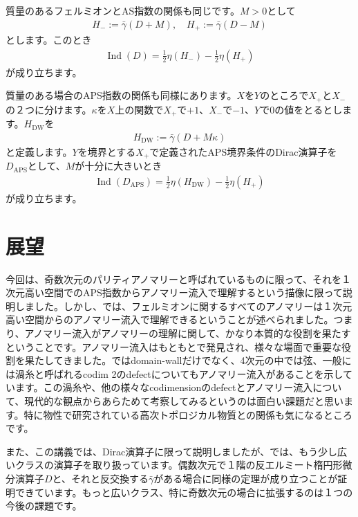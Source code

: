 \documentclass[paper=a4, fontsize=12pt, line_length=16cm, number_of_lines=33,dvipdfmx]{jlreq}
\numberwithin{equation}{section}
\newcommand{\gammab}{\bar{\gamma}}
\DeclareMathOperator{\Ind}{\mathrm{Ind}}
\newcommand{\DAPS}{D_{\mathrm{APS}}}
\newcommand{\Hm}{H_{-}}
\newcommand{\Hp}{H_{+}}
\newcommand{\HDW}{H_{\mathrm{DW}}}
\begin{document}
質量のあるフェルミオンとAS指数の関係も同じです。$M>0$として
\begin{align}
  \Hm:=\gammab(D+M),\quad \Hp:=\gammab(D-M)
\end{align}
とします。このとき
\begin{align}
  \Ind(D)=\frac12\eta(\Hm)-\frac12 \eta(\Hp)
\end{align}
が成り立ちます。

質量のある場合のAPS指数の関係も同様にあります。$X$を$Y$のところで$X_{+}$と$X_{-}$の２つに分けます。$\kappa$を$X$上の関数で$X_{+}$で$+1$、$X_{-}$で$-1$、$Y$で$0$の値をとるとします。$\HDW$を
\begin{align}
  \HDW:=\gammab(D+M\kappa)
\end{align}
と定義します。$Y$を境界とする$X_{+}$で定義されたAPS境界条件のDirac演算子を$\DAPS$として、$M$が十分に大きいとき
\begin{align}
  \Ind(\DAPS)=\frac12 \eta(\HDW)-\frac12 \eta(\Hp)\label{massiveAPSgeneraldim}
\end{align}
が成り立ちます。


\section{展望}

今回は、奇数次元のパリティアノマリーと呼ばれているものに限って、それを１次元高い空間でのAPS指数からアノマリー流入で理解するという描像に限って説明しました。しかし、\cite{Witten:2015aba}では、フェルミオンに関するすべてのアノマリーは１次元高い空間からのアノマリー流入で理解できるということが述べられました。つまり、アノマリー流入がアノマリーの理解に関して、かなり本質的な役割を果たすということです。アノマリー流入はもともと\cite{Callan:1984sa}で発見され、様々な場面で重要な役割を果たしてきました。\cite{Callan:1984sa}ではdomain-wallだけでなく、4次元の中では弦、一般には渦糸と呼ばれるcodim 2のdefectについてもアノマリー流入があることを示しています。この渦糸や、他の様々なcodimensionのdefectとアノマリー流入について、現代的な観点からあらためて考察してみるというのは面白い課題だと思います。特に物性で研究されている高次トポロジカル物質との関係も気になるところです。

また、この講義では、Dirac演算子に限って説明しましたが、\cite{Fukaya:2019qlf}では、もう少し広いクラスの演算子を取り扱っています。偶数次元で１階の反エルミート楕円形微分演算子$D$と、それと反交換する$\gammab$がある場合に同様の定理が成り立つことが証明できています。もっと広いクラス、特に奇数次元の場合に拡張するのは１つの今後の課題です。
\end{document}
